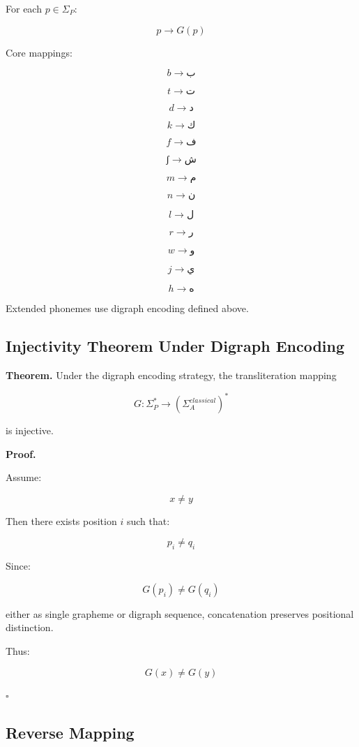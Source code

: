 \documentclass[12pt]{article}
\begin{document}
For each \( p \in \Sigma_P \):

\[
p \rightarrow G(p)
\]

Core mappings:

\[
b \rightarrow ب
\]

\[
t \rightarrow ت
\]

\[
d \rightarrow د
\]

\[
k \rightarrow ك
\]

\[
f \rightarrow ف
\]

\[
ʃ \rightarrow ش
\]

\[
m \rightarrow م
\]

\[
n \rightarrow ن
\]

\[
l \rightarrow ل
\]

\[
r \rightarrow ر
\]

\[
w \rightarrow و
\]

\[
j \rightarrow ي
\]

\[
h \rightarrow ه
\]

Extended phonemes use digraph encoding defined above.

\subsection{Injectivity Theorem Under Digraph Encoding}

\textbf{Theorem.}  
Under the digraph encoding strategy, the transliteration mapping

\[
G : \Sigma_P^* \rightarrow (\Sigma_A^{classical})^*
\]

is injective.

\textbf{Proof.}

Assume:

\[
x \neq y
\]

Then there exists position \( i \) such that:

\[
p_i \neq q_i
\]

Since:

\[
G(p_i) \neq G(q_i)
\]

either as single grapheme or digraph sequence, concatenation preserves positional distinction.

Thus:

\[
G(x) \neq G(y)
\]

\hfill \( \square \)

\subsection{Reverse Mapping}
\end{document}
